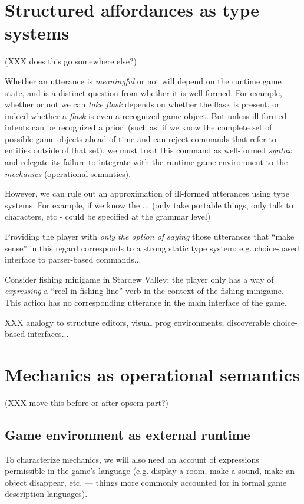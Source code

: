   \section{Structured affordances as type systems}
  (XXX does this go somewhere else?)
  
  Whether an utterance is {\em meaningful} or not will depend on
  the runtime game state, and is a distinct question from whether it is
  well-formed. For example, whether or not we can {\em take
  flask} depends on whether the flask is present, or indeed whether a {\em
  flask} is even a recognized game object. But unless ill-formed intents can be
  recognized a priori (such as: if we know the complete set of possible
  game objects ahead of time and can reject commands that refer to entities
  outside of that set), we must treat this command as well-formed {\em
  syntax} and relegate its failure to integrate with the runtime game
  environment to the {\em mechanics} (operational semantics).

  However, we can rule out an approximation of ill-formed utterances using
  type systems. For example, if we know the ...
  (only take portable things, only talk to characters, etc - could be
  specified at the grammar level)
  
  Providing the player with {\em only the option of saying} those
  utterances that ``make sense'' in this regard corresponds to a strong
  static type system: e.g. choice-based interface to parser-based
  commands...

  Consider fishing minigame in Stardew Valley: the player only has a way of
  {\em expressing} a ``reel in fishing line'' verb in the context of the
  fishing minigame. This action has no corresponding utterance in the main
  interface of the game.

  XXX analogy to structure editors, visual prog environments, discoverable
  choice-based interfaces...


  \section{Mechanics as operational semantics}

  (XXX move this before or after opsem part?)
  \subsection{Game environment as external runtime}

  To characterize mechanics, we will also need an account of expressions
  permissible in the game's language (e.g. display a room, make a sound,
  make an object disappear, etc. --- things more commonly accounted for in
  formal game description languages). 

